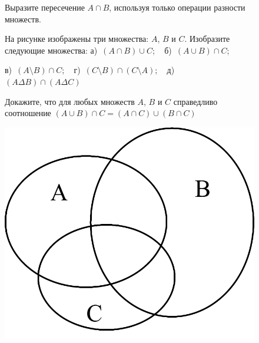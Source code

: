 {\setlength{\intextsep}{2pt}
\begin{figure}[H]
\begin{minipage}{0.74\linewidth}\setlength{\parindent}{1.5em}
\begin{ex}\label{5.0 u3}
    Выразите пересечение $A \cap B$, используя только операции разности множеств.
\end{ex}
   \begin{ex}\label{5.0 u4}На рисунке изображены три множества: $A$, $B$ и $C$. Изобразите следующие множества:
    а)~$(A \cap B)\cup C$;
    ~
    б)~$(A \cup B)\cap C$; 
    \par
    в)~$(A \setminus B)\cap C$;
    ~
    г)~$(C \setminus B)\cap(C \setminus A)$;
    ~
    д)~$(A \Delta B)\cap(A \Delta C)$
    \end{ex}
    \begin{thm}
Докажите, что для любых множеств $A$, $B$ и $C$ справедливо соотношение $(A \cup B) \cap C = (A \cap C) \cup (B \cap C)$
\end{thm}
\end{minipage}
\hfill
\begin{minipage}{0.25\linewidth}
    \includegraphics[width=0.9\columnwidth]{img/euler.png}
\end{minipage}
\end{figure}}

